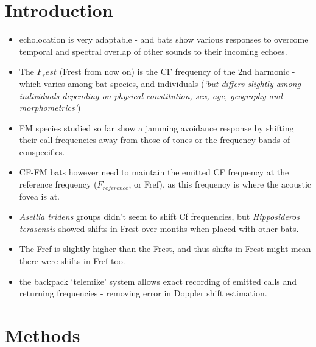 \documentclass[
]{book}
\providecommand{\tightlist}{%
  \setlength{\itemsep}{0pt}\setlength{\parskip}{0pt}}
\begin{document}
\hypertarget{introduction-14}{%
\section{Introduction}\label{introduction-14}}

\begin{itemize}
\tightlist
\item
  echolocation is very adaptable - and bats show various responses to overcome temporal and spectral overlap of
  other sounds to their incoming echoes.
\item
  The \(F_rest\) (Frest from now on) is the CF frequency of the 2nd harmonic - which varies among bat species, and individuals (\emph{`but differs slightly among individuals depending on physical constitution, sex, age, geography and morphometrics'})
\item
  FM species studied so far show a jamming avoidance response by shifting their call frequencies away from those of tones or the frequency bands of conspecifics.
\item
  CF-FM bats however need to maintain the emitted CF frequency at the reference frequency (\(F_{reference}\), or Fref), as this frequency is where the acoustic fovea is at.
\item
  \emph{Asellia tridens} groups didn't seem to shift Cf frequencies, but \emph{Hipposideros terasensis} showed shifts in Frest over months when placed with other bats.
\item
  The Fref is slightly higher than the Frest, and thus shifts in Frest might mean there were shifts in Fref too.
\item
  the backpack `telemike' system allows exact recording of emitted calls and returning frequencies - removing error in Doppler shift estimation.
\end{itemize}

\hypertarget{methods-13}{%
\section{Methods}\label{methods-13}}
\end{document}

